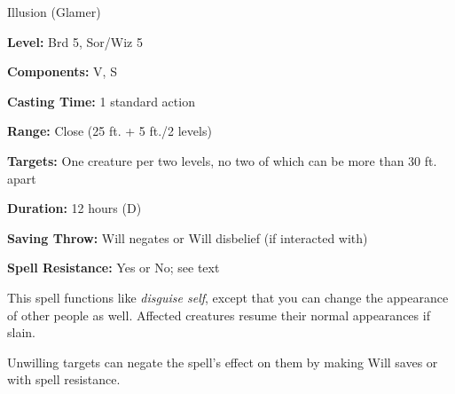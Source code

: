 
Illusion (Glamer)

\textbf{Level:} Brd 5, Sor/Wiz 5

\textbf{Components:} V, S

\textbf{Casting Time:} 1 standard action

\textbf{Range:} Close (25 ft. + 5 ft./2 levels)

\textbf{Targets:} One creature per two levels, no two of which can be more than 
30 ft. apart

\textbf{Duration:} 12 hours (D)

\textbf{Saving Throw:} Will negates or Will disbelief (if interacted with)

\textbf{Spell Resistance:} Yes or No; see text

This spell functions like \textit{disguise self}, except that you can change the 
appearance of other people as well. Affected creatures resume their normal appearances 
if slain.

Unwilling targets can negate the spell's effect on them by making Will saves or 
with spell resistance.

